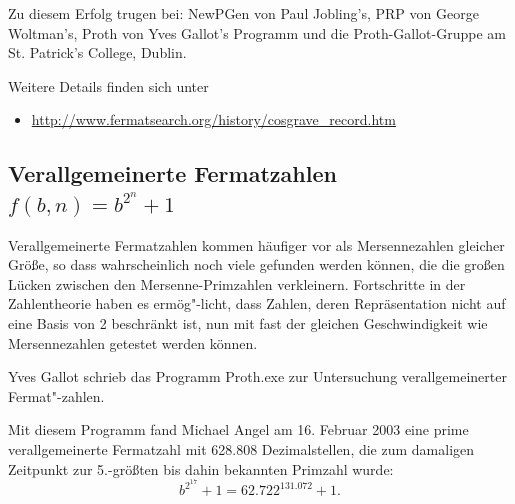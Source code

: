 \begin{refsegment}
    Zu diesem Erfolg trugen bei: NewPGen von Paul Jobling's, PRP von
    George Woltman's, Proth von Yves Gallot's Programm und
    die Proth-Gallot-Gruppe am St. Patrick's College, Dublin.

    Weitere Details finden sich unter
    \vspace{-10pt}
    \begin{itemize}
      \item[] \url{http://www.fermatsearch.org/history/cosgrave_record.htm}
    \end{itemize}





\hypertarget{generalizedFermatprimes}{}    %
\subsection
    [Verallgemeinerte Fermatzahlen \texorpdfstring{$f(b,n) = b^{2^n} + 1$}{f(b,n) = b\^{}{2\^{}n} + 1}]
    {Verallgemeinerte Fermatzahlen\footnotemark~$f(b,n) = b^{2^n} + 1$}
\label{generalized-fermat}
    Verallgemeinerte Fermatzahlen kommen häufiger vor als Mersennezahlen
    gleicher Größe, so dass wahrscheinlich noch viele gefunden werden
    können, die die großen Lücken zwischen den Mersenne-Primzahlen
    verkleinern.
    Fortschritte in der Zahlentheorie haben es ermög"-licht, dass Zahlen,
    deren Repräsentation nicht auf eine Basis von 2 beschränkt ist,
    nun mit fast der gleichen Geschwindigkeit wie Mersennezahlen getestet
    werden können.

    Yves Gallot schrieb das Programm Proth.exe zur
    Untersuchung verallgemeinerter Fermat"-zahlen.

    Mit diesem Programm fand Michael Angel am 16. Februar 2003 eine
    prime verallgemeinerte Fermatzahl mit 628.808 Dezimalstellen,
    die zum damaligen Zeitpunkt zur 5.-größten bis dahin bekannten
    Primzahl wurde:
    $$ b^{2^{17}} + 1  =  62.722^{131.072} + 1. $$


\end{refsegment}
